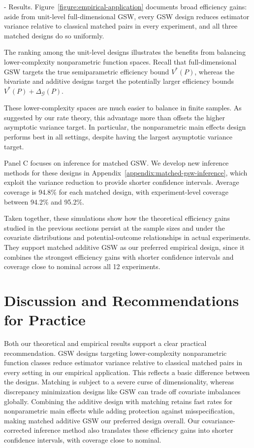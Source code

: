 \documentclass[letterpaper,12pt]{article}
\makeatletter
\theoremstyle{definition}
\numberwithin{equation}{section}
\newcommand{\mc}{\mathcal}
\renewcommand{\paragraph}{\@startsection{paragraph}{4}{\z@}%
  {\medskipamount}%
  {-\fontdimen2\font}%
  {\normalfont\normalsize\bfseries}}
\makeatother
\begin{document}
\paragraph{Results.}
Figure~\ref{figure:empirical-application} documents broad efficiency gains: aside from unit-level full-dimensional GSW, every GSW design reduces estimator variance relative to classical matched pairs in every experiment, and all three matched designs do so uniformly.

The ranking among the unit-level designs illustrates the benefits from balancing lower-complexity nonparametric function spaces.
Recall that full-dimensional GSW targets the true semiparametric efficiency bound $V^*(P)$, whereas the bivariate and additive designs target the potentially larger efficiency bounds $V^*(P)+\Delta_{\mc G}(P)$.

These lower-complexity spaces are much easier to balance in finite samples.
As suggested by our rate theory, this advantage more than offsets the higher asymptotic variance target.
In particular, the nonparametric main effects design performs best in all settings, despite having the largest asymptotic variance target.

Panel C focuses on inference for matched GSW.
We develop new inference methods for these designs in Appendix~\ref{appendix:matched-gsw-inference}, which exploit the variance reduction to provide shorter confidence intervals.
Average coverage is 94.8\% for each matched design, with experiment-level coverage between 94.2\% and 95.2\%.

Taken together, these simulations show how the theoretical efficiency gains studied in the previous sections persist at the sample sizes and under the covariate distributions and potential-outcome relationships in actual experiments.
They support matched additive GSW as our preferred empirical design, since it combines the strongest efficiency gains with shorter confidence intervals and coverage close to nominal across all 12 experiments.

\section{Discussion and Recommendations for Practice}\label{section:discussion}

Both our theoretical and empirical results support a clear practical recommendation.
GSW designs targeting lower-complexity nonparametric function classes reduce estimator variance relative to classical matched pairs in every setting in our empirical application.
This reflects a basic difference between the designs.
Matching is subject to a severe curse of dimensionality, whereas discrepancy minimization designs like GSW can trade off covariate imbalances globally.
Combining the additive design with matching retains fast rates for nonparametric main effects while adding protection against misspecification, making matched additive GSW our preferred design overall.
Our covariance-corrected inference method also translates these efficiency gains into shorter confidence intervals, with coverage close to nominal.
\end{document}
